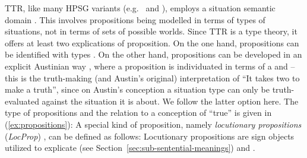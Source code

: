 \documentclass[output=paper
 	        ,biblatex
                ,babelshorthands
                ,newtxmath
                ,draftmode
                ,colorlinks, citecolor=brown
]{langscibook}
\begin{document}
TTR, like many HPSG variants (e.g.\ \citealt{Pollard:Sag:1987} and \citealt{Pollard:Sag:1994}), employs a situation semantic domain \citep{Cooper:ms}.
%
This involves propositions being modelled in terms of types of situations, not in terms of sets of possible worlds.
%
Since TTR is a type theory, it offers at least two explications of proposition.
%
On the one hand, propositions can be identified with types \citep{Cooper:2005:b}.
%
On the other hand, propositions can be developed in an explicit Austinian way \citep{Austin:1950}, where a proposition is individuated in terms of a  and  \citep[]{Ginzburg:2011:a} -- this is the truth-making (and Austin's original) interpretation of \enquote{It takes two to make a truth}, since on Austin's conception a situation type can only be truth-evaluated against the situation it is about.
%
We follow the latter option here.
%
The type of propositions and the relation to a  conception of \enquote{true} \citep{Barwise:Perry:1983} is given in (\ref{ex:propositions}):
%
\ea \label{ex:propositions}
\ea 
{}
\ex 
{}
\z
\z
%
A special kind of proposition, namely \emph{locutionary propositions} (\emph{LocProp}) \citep[]{Ginzburg:2012}, can be defined as follows:
%
\ea \label{ex:locprop}
\z
%
Locutionary propositions are sign objects utilized to explicate  (see Section~\ref{sec:sub-sentential-meanings}) and . 
\end{document}
